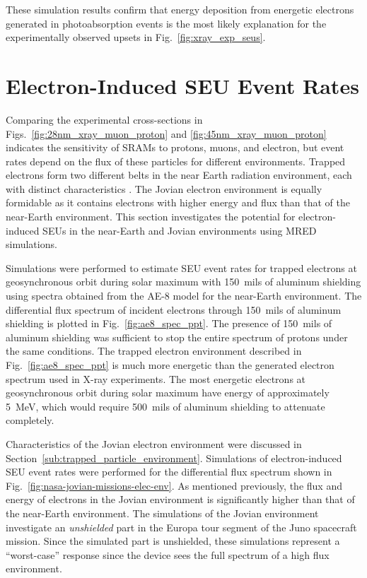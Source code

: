 These simulation results confirm that energy deposition from energetic electrons generated in photoabsorption events is the most likely explanation for the experimentally observed upsets in Fig.~\ref{fig:xray_exp_seus}. %

\section{Electron-Induced SEU Event Rates} %
\label{sec:electron_induced_seu_event_rates}
Comparing the experimental cross-sections in Figs.~\ref{fig:28nm_xray_muon_proton} and \ref{fig:45nm_xray_muon_proton} indicates the sensitivity of SRAMs to protons, muons, and electron, but event rates depend on the flux of these particles for different environments. 
Trapped electrons form two different belts in the near Earth radiation environment, each with distinct characteristics \cite{Bourdarie:kj, Xapsos:2013cu}.
The Jovian electron environment is equally formidable as it contains electrons with higher energy and flux than that of the near-Earth environment.
This section investigates the potential for electron-induced SEUs in the near-Earth and Jovian environments using MRED simulations.

Simulations were performed to estimate SEU event rates for trapped electrons at geosynchronous orbit during solar maximum with 150~mils of aluminum shielding using spectra obtained from the AE-8 model for the near-Earth environment.
The differential flux spectrum of incident electrons through 150~mils of aluminum shielding is plotted in Fig.~\ref{fig:ae8_spec_ppt}.
The presence of 150~mils of aluminum shielding was sufficient to stop the entire spectrum of protons under the same conditions.
The trapped electron environment described in Fig.~\ref{fig:ae8_spec_ppt} is much more energetic than the generated electron spectrum used in X-ray experiments.
The most energetic electrons at geosynchronous orbit during solar maximum have energy of approximately 5~MeV, which would require 500~mils of aluminum shielding to attenuate completely.

Characteristics of the Jovian electron environment were discussed in Section~\ref{sub:trapped_particle_environment}.
Simulations of electron-induced SEU event rates were performed for the differential flux spectrum shown in Fig.~\ref{fig:nasa-jovian-missions-elec-env}.
As mentioned previously, the flux and energy of electrons in the Jovian environment is significantly higher than that of the near-Earth environment.
The simulations of the Jovian environment investigate an \emph{unshielded} part in the Europa tour segment of the Juno spacecraft mission.
Since the simulated part is unshielded, these simulations represent a ``worst-case'' response since the device sees the full spectrum of a high flux environment.

